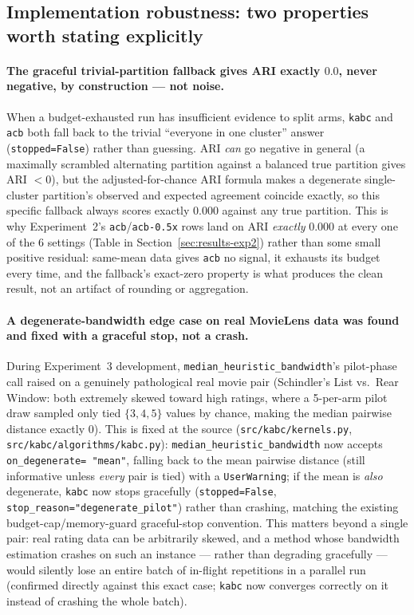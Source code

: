 \documentclass[11pt]{article}
\begin{document}
\subsection{Implementation robustness: two properties worth stating explicitly}
\label{sec:robustness}

\paragraph{The graceful trivial-partition fallback gives ARI exactly
$0.0$, never negative, by construction --- not noise.} When a
budget-exhausted run has insufficient evidence to split arms, \texttt{kabc}
and \texttt{acb} both fall back to the trivial ``everyone in one cluster''
answer (\texttt{stopped=False}) rather than guessing. ARI \emph{can} go
negative in general (a maximally scrambled alternating partition against a
balanced true partition gives ARI $<0$), but the adjusted-for-chance ARI
formula makes a degenerate single-cluster partition's observed and
expected agreement coincide exactly, so this specific fallback always
scores exactly $0.000$ against any true partition. This is why
Experiment~2's \texttt{acb}/\texttt{acb-0.5x} rows land on ARI \emph{exactly}
$0.000$ at every one of the 6 settings (Table in
Section~\ref{sec:results-exp2}) rather than some small positive residual:
same-mean data gives \texttt{acb} no signal, it exhausts its budget every
time, and the fallback's exact-zero property is what produces the clean
result, not an artifact of rounding or aggregation.

\paragraph{A degenerate-bandwidth edge case on real MovieLens data was
found and fixed with a graceful stop, not a crash.} During Experiment~3
development, \texttt{median\_heuristic\_bandwidth}'s pilot-phase call
raised on a genuinely pathological real movie pair (Schindler's List vs.\
Rear Window: both extremely skewed toward high ratings, where a 5-per-arm
pilot draw sampled only tied $\{3,4,5\}$ values by chance, making the
median pairwise distance exactly $0$). This is fixed at the source
(\texttt{src/kabc/kernels.py}, \texttt{src/kabc/algorithms/kabc.py}):
\texttt{median\_heuristic\_bandwidth} now accepts \texttt{on\_degenerate=
"mean"}, falling back to the mean pairwise distance (still informative
unless \emph{every} pair is tied) with a \texttt{UserWarning}; if the mean
is \emph{also} degenerate, \texttt{kabc} now stops gracefully
(\texttt{stopped=False}, \texttt{stop\_reason="degenerate\_pilot"}) rather
than crashing, matching the existing budget-cap/memory-guard graceful-stop
convention. This matters beyond a single pair: real rating data can be
arbitrarily skewed, and a method whose bandwidth estimation crashes on
such an instance --- rather than degrading gracefully --- would silently
lose an entire batch of in-flight repetitions in a parallel run (confirmed
directly against this exact case; \texttt{kabc} now converges correctly on
it instead of crashing the whole batch).
\end{document}
